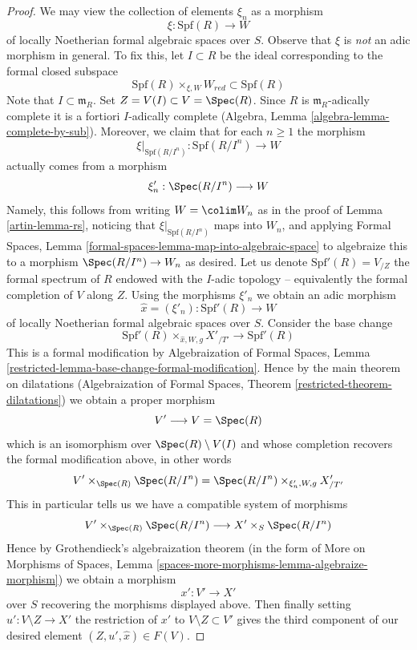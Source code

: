 \begin{proof}
\medskip\noindent
We may view the collection of elements $\xi_n$ as a morphism
$$
\xi : \text{Spf}(R) \longrightarrow W
$$
of locally Noetherian formal algebraic spaces over $S$. Observe that $\xi$
is {\it not} an adic morphism in general. To fix this, let $I \subset R$
be the ideal corresponding to the formal closed subspace
$$
\text{Spf}(R) \times_{\xi, W} W_{red} \subset \text{Spf}(R)
$$
Note that $I \subset \mathfrak m_R$. Set $Z = V(I) \subset V = \Spec(R)$.
Since $R$ is $\mathfrak m_R$-adically complete it is a fortiori
$I$-adically complete (Algebra, Lemma \ref{algebra-lemma-complete-by-sub}).
Moreover, we claim that for each $n \geq 1$ the morphism
$$
\xi|_{\text{Spf}(R/I^n)} :
\text{Spf}(R/I^n)
\longrightarrow
W
$$
actually comes from a morphism
$$
\xi'_n :  \Spec(R/I^n) \longrightarrow W
$$
Namely, this follows from writing $W = \colim W_n$ as in the
proof of Lemma \ref{artin-lemma-rs}, noticing that $\xi|_{\text{Spf}(R/I^n)}$
maps into $W_n$, and applying Formal Spaces, Lemma
\ref{formal-spaces-lemma-map-into-algebraic-space}
to algebraize this to a morphism $\Spec(R/I^n) \to W_n$
as desired. Let us denote $\text{Spf}'(R) = V_{/Z}$ the formal spectrum
of $R$ endowed with the $I$-adic topology -- equivalently the formal
completion of $V$ along $Z$. Using the morphisms
$\xi'_n$ we obtain an adic morphism
$$
\hat x = (\xi'_n) : \text{Spf}'(R) \longrightarrow W
$$
of locally Noetherian formal algebraic spaces over $S$.
Consider the base change
$$
\text{Spf}'(R) \times_{\hat x, W, g} X'_{/T'} \longrightarrow \text{Spf}'(R)
$$
This is a formal modification by
Algebraization of Formal Spaces, Lemma
\ref{restricted-lemma-base-change-formal-modification}.
Hence by the main theorem on dilatations
(Algebraization of Formal Spaces, Theorem \ref{restricted-theorem-dilatations})
we obtain a proper morphism
$$
V' \longrightarrow V = \Spec(R)
$$
which is an isomorphism over $\Spec(R) \setminus V(I)$ and
whose completion recovers the formal modification above, in other words
$$
V' \times_{\Spec(R)} \Spec(R/I^n) =
\Spec(R/I^n) \times_{\xi'_n, W, g} X'_{/T'}
$$
This in particular tells us we have a compatible system of morphisms
$$
V' \times_{\Spec(R)} \Spec(R/I^n) \longrightarrow X' \times_S \Spec(R/I^n)
$$
Hence by Grothendieck's algebraization theorem (in the form of
More on Morphisms of Spaces, Lemma
\ref{spaces-more-morphisms-lemma-algebraize-morphism})
we obtain a morphism
$$
x' : V' \to X'
$$
over $S$ recovering the morphisms displayed above. Then finally
setting $u' : V \setminus Z \to X'$ the restriction of $x'$ to
$V \setminus Z \subset V'$ gives the third component of our
desired element $(Z, u', \hat x) \in F(V)$.
\end{proof}

